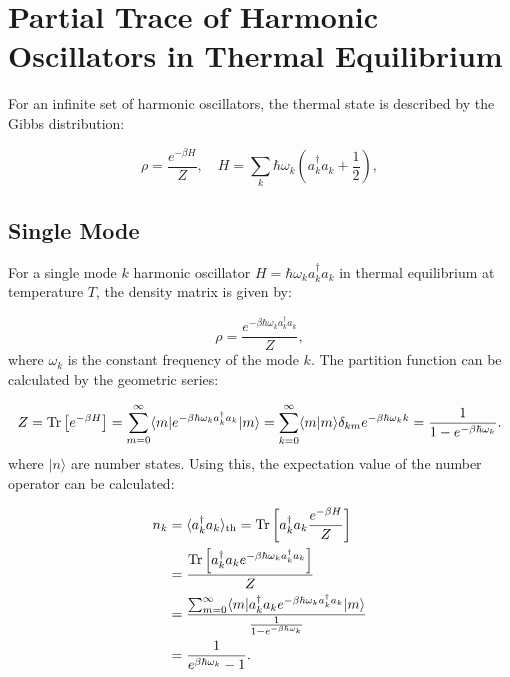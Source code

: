 
\section{Partial Trace of Harmonic Oscillators in Thermal Equilibrium}

For an infinite set of harmonic oscillators, the thermal state is described by the Gibbs distribution:

\begin{equation} \label{eq:gibbs_distribution}
\rho = \frac{e^{-\beta H}}{Z}, \quad H = \sum_k \hbar \omega_k \left(a_k^{\dagger} a_k + \frac{1}{2}\right),
\end{equation}

\subsection{Single Mode}
For a single mode \( k \) harmonic oscillator \( H = \hbar \omega_k a_k^{\dagger} a_k \) in thermal equilibrium at temperature \( T \), the density matrix is given by:

\begin{equation} \label{eq:single_mode_density_matrix}
\rho = \frac{e^{-\beta \hbar \omega_k a_k^{\dagger} a_k}}{Z},
\end{equation}
where \( \omega_k \) is the constant frequency of the mode \( k \).
The partition function can be calculated by the geometric series:

\begin{equation} \label{eq:partition_function}
    Z = \Tr\left[e^{-\beta H}\right] = \sum_{m=0}^{\infty} \langle m | e^{-\beta \hbar \omega_k a_k^{\dagger} a_k} | m \rangle
    = \sum_{k=0}^{\infty} \langle m | m \rangle \delta_{km} e^{-\beta \hbar \omega_k k} \\
    = \frac{1}{1 - e^{-\beta \hbar \omega_k}}. %
\end{equation}
where \(|n\rangle\) are number states. 
Using this, the expectation value of the number operator can be calculated:

\begin{align} \label{eq:expectation_number_operator}
n_k &= \langle a_k^{\dagger} a_k \rangle_{\text{th}} = \mathrm{Tr} \left[ a_k^{\dagger} a_k \frac{e^{-\beta H}}{Z} \right] \\
    &= \frac{\mathrm{Tr} \left[ a_k^{\dagger} a_k e^{-\beta \hbar \omega_k a_k^{\dagger} a_k} \right]}{Z} \\
    &= \frac{\sum_{m=0}^{\infty} \langle m|a_k^{\dagger} a_k e^{-\beta \hbar \omega_k a_k^{\dagger} a_k}|m \rangle}{\frac{1}{1 - e^{-\beta \hbar \omega_k}}} \\
    &= \frac{1}{e^{\beta \hbar \omega_k} - 1}.
\end{align}

